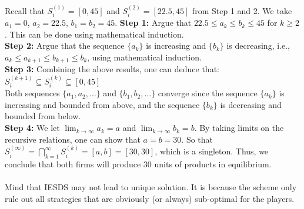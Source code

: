 \documentclass[twoside]{article}
\theoremstyle{definitionstyle}
\begin{document}
Recall that $S_i^{(1)} = [0,45]$ and $S_i^{(2)} = [22.5, 45]$ from Step 1 and 2. We take $a_1 = 0$, $a_2 = 22.5$, $b_1 = b_2 = 45$.
\textbf{Step 1:} Argue that $22.5 \leq a_k \leq b_k \leq 45$ for $k \geq 2$. This can be done using mathematical induction.
\\ \textbf{Step 2:} Argue that the sequence $\{a_k\}$ is increasing and $\{b_k\}$ is decreasing, i.e., $a_k \leq a_{k+1} \leq b_{k+1} \leq b_k$, using mathematical induction.
\\ \textbf{Step 3:} Combining the above results, one can deduce that:
$S_i^{(k+1)} \subseteq S_i^{(k)} \subseteq [0, 45]$ \\
Both sequences $\{a_1, a_2, \dots\}$ and $\{b_1, b_2, \dots\}$ converge since the sequence $\{a_k\}$ is increasing and bounded from above, and the sequence $\{b_k\}$ is decreasing and bounded from below.
\\ \textbf{Step 4:} We let $\lim_{k \to \infty} a_k = a$ and $\lim_{k \to \infty} b_k = b$. By taking limits on the recursive relations, one can show that $a=b=30$. So that $S_i^{(\infty)} = \bigcap_{k=1}^{\infty} S_i^{(k)} = [a, b] = [30, 30]$, which is a singleton.
Thus, we conclude that both firms will produce 30 units of products in equilibrium.\\
\\
Mind that IESDS may not lead to unique solution. It is because the scheme only rule out all strategies that are obviously (or always) sub-optimal for the players.
%
%
%
%
%
\end{document}
